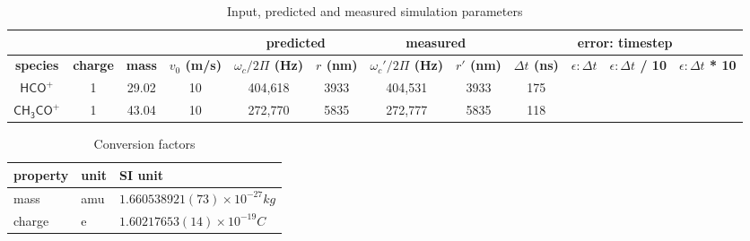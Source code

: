 \documentclass[10pt,conference,onecolumn]{IEEEtran}
\begin{document}
\begin{table}[htbp]
 \centering	  	  
 \caption{Input, predicted and measured simulation parameters}
\label{tab:params}
\begin{tabular}{c|c|c|c|c|c|c|c|c|c|c|c}
 \hline \hline
 \multicolumn{4}{|c|}{ } & \multicolumn{2}{|c|}{\textbf{predicted}} & \multicolumn{2}{|c|}{\textbf{measured}} & \multicolumn{4}{|c|}{\textbf{error: timestep}} \\ 
 \hline
 \textbf{species} & \textbf{charge} & \textbf{mass} & \textbf{$v_0$ (m/s)} & \textbf{$\omega_c / 2\Pi$ (Hz)} & \textbf{$r$ (nm)} & \textbf{$\omega_c' / 2\Pi$ (Hz)}  & \textbf{$r'$ (nm)} & \textbf{$\Delta t$ (ns)} & \textbf{$\epsilon: \Delta t$}& \textbf{$\epsilon: \Delta t$ / 10} & \textbf{$\epsilon: \Delta t$ * 10}\\ 
 \hline
 $\mathsf{HCO^+}$ & 1 & 29.02 & 10 & 404,618 & 3933 & 404,531 & 3933 & 175 & \\
 $\mathsf{CH_3CO^+}$ & 1 & 43.04 & 10 & 272,770 & 5835 & 272,777 & 5835 & 118 & \\
 \hline \hline
\end{tabular}
\end{table}

\begin{table}[htbp]
 \centering	  	  
 \caption{Conversion factors}
\label{tab:conversion}
\begin{tabular}{l|l|l}
\hline \hline
\textbf{property} & \textbf{unit} & \textbf{SI unit} \\
\hline
mass & amu & $1.660538921(73) \times 10^{−27} kg$ \\
charge & e   & $1.60217653(14) \times 10^{−19} C$ \\
\hline \hline
\end{tabular}
\end{table}



\end{document}
